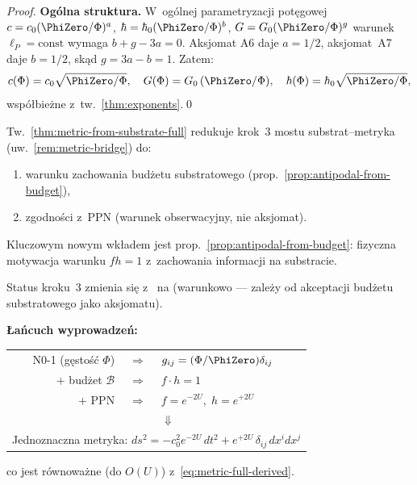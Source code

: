 \begin{proof}
\smallskip\noindent
\textbf{Og\'olna struktura.}
W~og\'olnej parametryzacji pot\k{e}gowej
$c = c_0(\PhiZero/\Phi)^a$,\;
$\hbar = \hbar_0(\PhiZero/\Phi)^b$,\;
$G = G_0(\PhiZero/\Phi)^g$
warunek $\ell_P = \text{const}$ wymaga
$b + g - 3a = 0$.
Aksjomat A6 daje $a = 1/2$, aksjomat~A7 daje $b = 1/2$,
sk\k{a}d $g = 3a - b = 1$.
Zatem:
\begin{equation}
  c(\Phi) = c_0\sqrt{\PhiZero/\Phi}, \quad
  G(\Phi) = G_0\,(\PhiZero/\Phi), \quad
  \hbar(\Phi) = \hbar_0\sqrt{\PhiZero/\Phi},
\end{equation}
wsp\'o\l{}bie\.zne z~tw.~\ref{thm:exponents}.\qed
\end{proof}

\begin{remark}%
\label{rem:step3-elimination}
Tw.~\ref{thm:metric-from-substrate-full} redukuje
krok~3 mostu substrat--metryka
(uw.~\ref{rem:metric-bridge}) do:
\begin{enumerate}[nosep]
  \item warunku zachowania bud\.zetu substratowego
        (prop.~\ref{prop:antipodal-from-budget}),
  \item zgodno\'sci z~PPN (warunek obserwacyjny, nie aksjomat).
\end{enumerate}
Kluczowym nowym wk\l{}adem jest
prop.~\ref{prop:antipodal-from-budget}: fizyczna motywacja
warunku $fh = 1$ z~zachowania informacji na substracie.

Status kroku~3 zmienia si\k{e} z~
na  (warunkowo --- zale\.zy
od akceptacji bud\.zetu substratowego jako aksjomatu).

\medskip\noindent
\textbf{Łańcuch wyprowadze\'n:}
\begin{center}
\begin{tabular}{rcl}
  N0-1 (g\k{e}sto\'s\'c $\Phi$) & $\Longrightarrow$ & $g_{ij} = (\Phi/\PhiZero)\delta_{ij}$ \\
  $+$ bud\.zet $\mathcal{B}$ & $\Longrightarrow$ & $f\cdot h = 1$ \\
  $+$ PPN & $\Longrightarrow$ & $f = e^{-2U},\; h = e^{+2U}$ \\
  && $\Downarrow$ \\
  \multicolumn{3}{c}{Jednoznaczna metryka: $ds^2 = -c_0^2 e^{-2U}\,dt^2 + e^{+2U}\,\delta_{ij}\,dx^i dx^j$}
\end{tabular}
\end{center}
co jest r\'ownowa\.zne (do $O(U)$) z~\eqref{eq:metric-full-derived}.
\end{remark}

